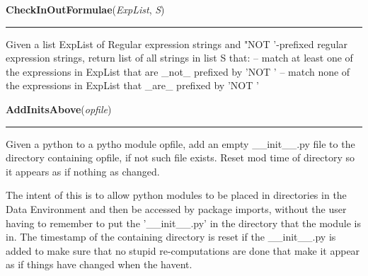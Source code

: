     \label{System:Utils:CheckInOutFormulae}

    \vspace{0.5ex}

\hspace{.8\funcindent}\begin{boxedminipage}{\funcwidth}

    \raggedright \textbf{CheckInOutFormulae}(\textit{ExpList}, \textit{S})

    \vspace{-1.5ex}

    \rule{\textwidth}{0.5\fboxrule}
\setlength{\parskip}{2ex}
    Given a list ExpList of Regular expression strings and "NOT '-prefixed 
    regular expression strings, return list of all strings in list S that: 
    -- match at least one of the expressions in ExpList that are \_not\_ 
    prefixed by 'NOT ' -- match none of the expressions in ExpList that 
    \_are\_ prefixed by 'NOT '

\setlength{\parskip}{1ex}
    \end{boxedminipage}

    \label{System:Utils:AddInitsAbove}

    \vspace{0.5ex}

\hspace{.8\funcindent}\begin{boxedminipage}{\funcwidth}

    \raggedright \textbf{AddInitsAbove}(\textit{opfile})

    \vspace{-1.5ex}

    \rule{\textwidth}{0.5\fboxrule}
\setlength{\parskip}{2ex}
    Given a python to a pytho module opfile, add an empty \_\_init\_\_.py 
    file to the directory containing opfile, if not such file exists. Reset
    mod time of directory so it appears as if nothing as changed.

    The intent of this is to allow python modules to be placed in 
    directories in the Data Environment and then be accessed by package 
    imports, without the user having to remember to put the 
    '\_\_init\_\_.py' in the directory that the module is in.   The 
    timestamp of the containing directory is reset if the \_\_init\_\_.py 
    is added to make sure that no stupid re-computations are done that make
    it appear as if things have changed when the havent.

\setlength{\parskip}{1ex}
    \end{boxedminipage}


